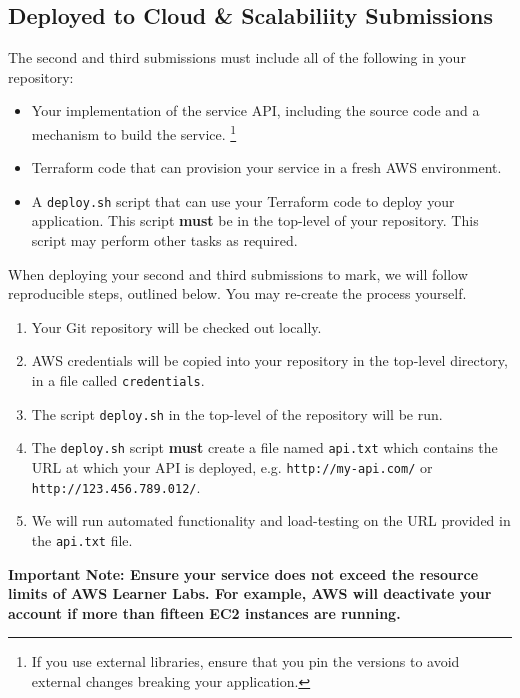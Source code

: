 \documentclass{csse4400}
\begin{document}
\begin{samepage}
\subsection{Deployed to Cloud \& Scalabiliity Submissions}
The second and third submissions must include all of the following in your repository:
\begin{itemize}
  \item Your implementation of the service API, including the source code and a mechanism to build the service.%
  \footnote{If you use external libraries, ensure that you pin the versions to avoid external changes breaking your application.}
  \item Terraform code that can provision your service in a fresh AWS environment.
  \item A \texttt{deploy.sh} script that can use your Terraform code to deploy your application. This script \textbf{must} be in the top-level of your repository. This script may perform other tasks as required.
\end{itemize}
\end{samepage}

\noindent
When deploying your second and third submissions to mark, we will follow reproducible steps, outlined below.
You may re-create the process yourself.

\begin{enumerate}
  \item Your Git repository will be checked out locally.
  \item AWS credentials will be copied into your repository in the top-level directory,
  in a file called \texttt{credentials}.
  \item The script \texttt{deploy.sh} in the top-level of the repository will be run.
  \item The \texttt{deploy.sh} script \textbf{must} create a file named \texttt{api.txt} which contains the URL at which your API is deployed, e.g. \texttt{http://my-api.com/} or \texttt{http://123.456.789.012/}.
  \item We will run automated functionality and load-testing on the URL provided in the \texttt{api.txt} file.
\end{enumerate}

\noindent
\textbf{Important Note: Ensure your service does not exceed the resource limits of AWS Learner Labs. For example, AWS will deactivate your account if more than fifteen EC2 instances are running.}
\end{document}
